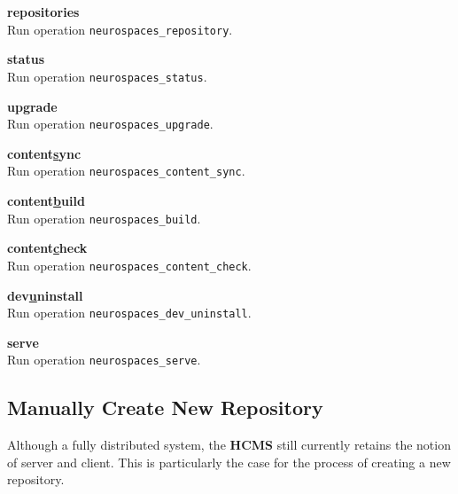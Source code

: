 \documentclass[12pt]{article}
\begin{document}
\begin{description}
\begin{description} 
\item {\bf repositories}\\
	Run operation {\tt \small neurospaces\_repository}.
\item {\bf status}\\
	Run operation {\tt \small neurospaces\_status}.
\item {\bf upgrade}\\
	Run operation {\tt \small neurospaces\_upgrade}.
\item {\bf content\underline{s}ync}\\
	Run operation {\tt \small neurospaces\_content\_sync}.
\item {\bf content\underline{b}uild}\\
	Run operation {\tt \small neurospaces\_build}.
\item {\bf content\underline{c}heck}\\
	Run operation {\tt \small neurospaces\_content\_check}.
\item {\bf dev\underline{u}ninstall}\\
	Run operation {\tt \small neurospaces\_dev\_uninstall}.
\item {\bf serve}\\
	Run operation {\tt \small neurospaces\_serve}.
\end{description}

\end{description}

\subsection{Manually Create New Repository}

Although a fully distributed system, the {\bf \small HCMS} still currently retains the notion of server and client. This is particularly the case for the process of creating a new repository. 
\end{document}
